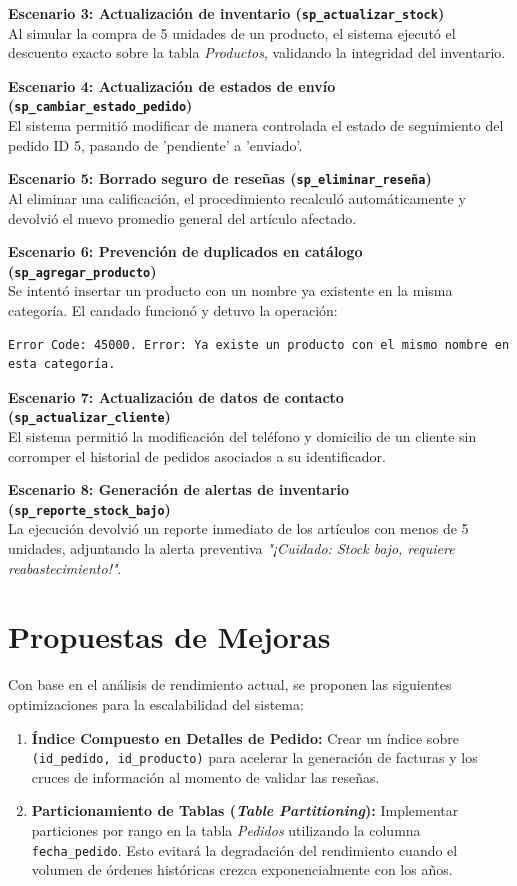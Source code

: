 \documentclass[11pt,a4paper]{article}
\begin{document}
\textbf{Escenario 3: Actualización de inventario (\texttt{sp\_actualizar\_stock})} \\
Al simular la compra de 5 unidades de un producto, el sistema ejecutó el descuento exacto sobre la tabla \textit{Productos}, validando la integridad del inventario.

\textbf{Escenario 4: Actualización de estados de envío (\texttt{sp\_cambiar\_estado\_pedido})} \\
El sistema permitió modificar de manera controlada el estado de seguimiento del pedido ID 5, pasando de 'pendiente' a 'enviado'.

\textbf{Escenario 5: Borrado seguro de reseñas (\texttt{sp\_eliminar\_reseña})} \\
Al eliminar una calificación, el procedimiento recalculó automáticamente y devolvió el nuevo promedio general del artículo afectado.

\textbf{Escenario 6: Prevención de duplicados en catálogo (\texttt{sp\_agregar\_producto})} \\
Se intentó insertar un producto con un nombre ya existente en la misma categoría. El candado funcionó y detuvo la operación:
\begin{lstlisting}[numbers=none]
Error Code: 45000. Error: Ya existe un producto con el mismo nombre en esta categoría.
\end{lstlisting}

\textbf{Escenario 7: Actualización de datos de contacto (\texttt{sp\_actualizar\_cliente})} \\
El sistema permitió la modificación del teléfono y domicilio de un cliente sin corromper el historial de pedidos asociados a su identificador.

\textbf{Escenario 8: Generación de alertas de inventario (\texttt{sp\_reporte\_stock\_bajo})} \\
La ejecución devolvió un reporte inmediato de los artículos con menos de 5 unidades, adjuntando la alerta preventiva \textit{"¡Cuidado: Stock bajo, requiere reabastecimiento!"}.

\section{Propuestas de Mejoras}
Con base en el análisis de rendimiento actual, se proponen las siguientes optimizaciones para la escalabilidad del sistema:
\begin{enumerate}
    \item \textbf{Índice Compuesto en Detalles de Pedido:} Crear un índice sobre \texttt{(id\_pedido, id\_producto)} para acelerar la generación de facturas y los cruces de información al momento de validar las reseñas.
    \item \textbf{Particionamiento de Tablas (\textit{Table Partitioning}):} Implementar particiones por rango en la tabla \textit{Pedidos} utilizando la columna \texttt{fecha\_pedido}. Esto evitará la degradación del rendimiento cuando el volumen de órdenes históricas crezca exponencialmente con los años.
\end{enumerate}
\end{document}
